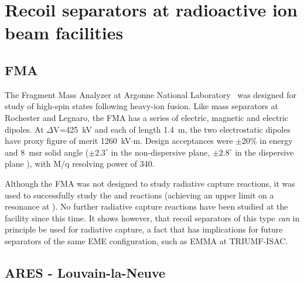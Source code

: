 \section{Recoil separators at radioactive ion beam facilities}

\subsection{FMA}
The Fragment Mass Analyzer at Argonne National Laboratory~\cite{Da92} was designed for study of high-spin states following heavy-ion fusion.  Like mass separators at Rochester and Legnaro, the FMA has a series of electric, magnetic and electric dipoles.   At $\Delta$V=425~kV and each of length 1.4~m, the two electrostatic dipoles have proxy figure of merit 1260~kV$\cdot$m.  Design acceptances were $\pm$20\% in energy and 8~msr solid angle ($\pm2.3^{\circ}$ in the non-dispersive plane, $\pm2.8^{\circ}$ in the dispersive plane \cite{dav12}), with M/q resolving power of 340.

Although the FMA was not designed to study radiative capture reactions, it was used to successfully study the  and   reactions \cite{reh97} (achieving an upper limit on a resonance at ). No further radiative capture reactions have been studied at the facility since this time. It shows however, that recoil separators of this type {\em can} in principle be used for radiative capture, a fact that has implications for future separators of the same EME configuration, such as EMMA at TRIUMF-ISAC. 


\subsection{ARES - Louvain-la-Neuve}

